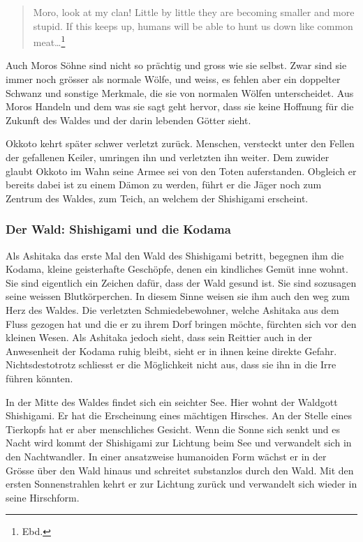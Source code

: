 \begin{quote}
\glqq Moro, look at my clan! Little by little they are becoming smaller and more stupid. If this keeps up, humans will be able to hunt us down like common meat\dots\grqq \footnote{Ebd.}
\end{quote}

Auch Moros Söhne sind nicht so prächtig und gross wie sie selbst. Zwar sind sie immer noch grösser als normale Wölfe, und weiss, es fehlen aber ein doppelter Schwanz und sonstige Merkmale, die sie von normalen Wölfen unterscheidet. Aus Moros Handeln und dem was sie sagt geht hervor, dass sie keine Hoffnung für die Zukunft des Waldes und der darin lebenden Götter sieht. 

Okkoto kehrt später schwer verletzt zurück. Menschen, versteckt unter den Fellen der gefallenen Keiler, umringen ihn und verletzten ihn weiter. Dem zuwider glaubt Okkoto im Wahn seine Armee sei von den Toten auferstanden. Obgleich er bereits dabei ist zu einem Dämon zu werden, führt er die Jäger noch zum Zentrum des Waldes, zum Teich, an welchem der Shishigami erscheint.  

\subsubsection*{Der Wald: Shishigami und die Kodama} 
Als Ashitaka das erste Mal den Wald des Shishigami betritt, begegnen ihm die Kodama, kleine geisterhafte Geschöpfe, denen ein kindliches Gemüt inne wohnt. Sie sind eigentlich ein Zeichen dafür, dass der Wald gesund ist. Sie sind sozusagen seine weissen Blutkörperchen. In diesem Sinne weisen sie ihm auch den weg zum Herz des Waldes. Die verletzten Schmiedebewohner, welche Ashitaka aus dem Fluss gezogen hat und die er zu ihrem Dorf bringen möchte, fürchten sich vor den kleinen Wesen. Als Ashitaka jedoch sieht, dass sein Reittier auch in der Anwesenheit der Kodama ruhig bleibt, sieht er in ihnen keine direkte Gefahr. Nichtsdestotrotz schliesst er die Möglichkeit nicht aus, dass sie ihn in die Irre führen könnten. 

In der Mitte des Waldes findet sich ein seichter See. Hier wohnt der Waldgott Shishigami. Er hat die Erscheinung eines mächtigen Hirsches. An der Stelle eines Tierkopfs hat er aber menschliches Gesicht. Wenn die Sonne sich senkt und es Nacht wird kommt der Shishigami zur Lichtung beim See und verwandelt sich in den Nachtwandler. In einer ansatzweise humanoiden Form wächst er in der Grösse über den Wald hinaus und schreitet substanzlos durch den Wald. Mit den ersten Sonnenstrahlen kehrt er zur Lichtung zurück und verwandelt sich wieder in seine Hirschform. 

